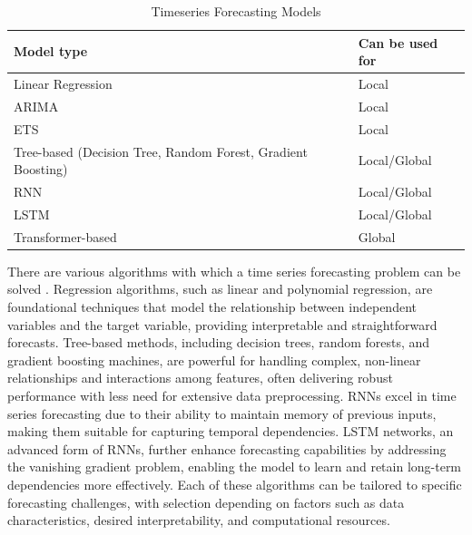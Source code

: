 \begin{table}[h]
    \centering
    \begin{tabular}{ll}
        \toprule
        \textbf{Model type}                                          & \textbf{Can be used for} \\
        \midrule
        Linear Regression                                            & Local                    \\
        \midrule
        ARIMA                                                        & Local                    \\
        \midrule
        ETS                                                          & Local                    \\
        \midrule
        Tree-based (Decision Tree, Random Forest, Gradient Boosting) & Local/Global             \\
        \midrule
        RNN                                                          & Local/Global             \\
        \midrule
        LSTM                                                         & Local/Global             \\
        \midrule
        Transformer-based                                            & Global                   \\

        \bottomrule
    \end{tabular}
    \caption{Timeseries Forecasting Models}
    \label{tab:timeseries_models}
\end{table}

There are various algorithms with which a time series forecasting problem can be
solved \parencite{salinas2020deepar}. Regression algorithms, such as linear and
polynomial regression, are foundational techniques that model the relationship
between independent variables and the target variable, providing interpretable
and straightforward forecasts. Tree-based methods, including decision trees,
random forests, and gradient boosting machines, are powerful for handling complex,
non-linear relationships and interactions among features, often delivering robust
performance with less need for extensive data preprocessing. \ac{RNNs} excel in
time series forecasting due to their ability to maintain memory of previous inputs,
making them suitable for capturing temporal dependencies. \ac{LSTM} networks, an
advanced form of \ac{RNNs}, further enhance forecasting capabilities by addressing
the vanishing gradient problem, enabling the model to learn and retain long-term
dependencies more effectively. Each of these algorithms can be tailored to specific
forecasting challenges, with selection depending on factors such as data characteristics,
desired interpretability, and computational resources.


